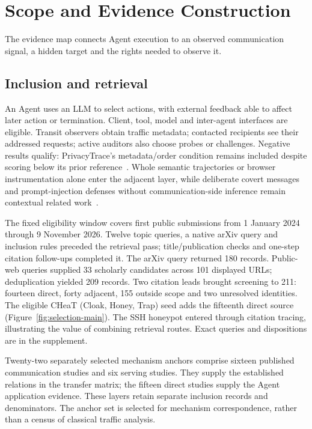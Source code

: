 \section{Scope and Evidence Construction}\label{sec:scope}
The evidence map connects Agent execution to an observed communication signal, a hidden target and the rights needed to observe it.

\subsection{Inclusion and retrieval}
An Agent uses an LLM to select actions, with external feedback able to affect later action or termination. Client, tool, model and inter-agent interfaces are eligible. Transit observers obtain traffic metadata; contacted recipients see their addressed requests; active auditors also choose probes or challenges. Negative results qualify: PrivacyTrace's metadata/order condition remains included despite scoring below its prior reference~\cite{duan2026privacytrace}. Whole semantic trajectories or browser instrumentation alone enter the adjacent layer, while deliberate covert messages and prompt-injection defenses without communication-side inference remain contextual related work~\cite{yao2026intentminer,uitraces2026}.

The fixed eligibility window covers first public submissions from 1 January 2024 through 9 November 2026. Twelve topic queries, a native arXiv query and inclusion rules preceded the retrieval pass; title/publication checks and one-step citation follow-ups completed it. The arXiv query returned 180 records. Public-web queries supplied 33 scholarly candidates across 101 displayed URLs; deduplication yielded 209 records. Two citation leads brought screening to 211: fourteen direct, forty adjacent, 155 outside scope and two unresolved identities. The eligible CHeaT (Cloak, Honey, Trap) seed adds the fifteenth direct source (Figure~\ref{fig:selection-main}). The SSH honeypot entered through citation tracing, illustrating the value of combining retrieval routes. Exact queries and dispositions are in the supplement.


Twenty-two separately selected mechanism anchors comprise sixteen published communication studies and six serving studies. They supply the established relations in the transfer matrix; the fifteen direct studies supply the Agent application evidence. These layers retain separate inclusion records and denominators. The anchor set is selected for mechanism correspondence, rather than a census of classical traffic analysis.

